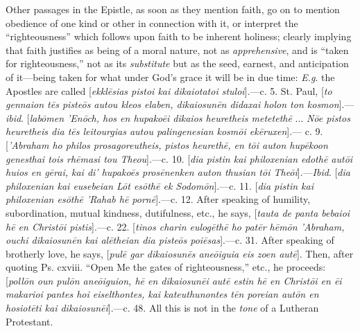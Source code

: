 Other passages in the Epistle, as soon as they mention faith, go on
to mention obedience of one kind or other in connection with it, or
interpret the ``righteousness'' which follows upon faith to be
inherent holiness; clearly implying that faith justifies as being of a
moral nature, not as \emph{apprehensive}, and is ``taken for
righteousness,'' not as its \emph{substitute} but as the seed,
earnest, and anticipation of it—being taken for what under God's
grace it will be in due time: \emph{E.g}. the Apostles are called [\emph{ekkl\={e}sias
pistoi kai dikaiotatoi stuloi}].—c. 5. St. Paul, [\emph{to gennaion
t\={e}s piste\={o}s autou kleos elaben, dikaiosun\={e}n
didaxai holon ton kosmon}].—\emph{ibid}. [\emph{lab\={o}men 'En\={o}ch, hos en
hupako\={e}i dikaios heuretheis meteteth\={e}}
... \emph{N\={o}e pistos heuretheis dia t\={e}s leitourgias autou
palingenesian kosm\={o}i ek\={e}ruxen}].— c. 9. [\emph{'Abraham
ho philos prosagoreutheis, pistos heureth\={e}, en t\={o}i auton
hup\={e}koon genesthai tois rh\={e}masi tou Theou}].—c.
10. [\emph{dia pistin kai philoxenian edoth\={e} aut\={o}i huios en
g\={e}rai, kai di' hupako\={e}s pros\={e}nenken auton thusian t\={o}i
The\={o}i}].—\emph{Ibid}. [\emph{dia philoxenian kai eusebeian L\={o}t
es\={o}th\={e} ek Sodom\={o}n}].—c.
11. [\emph{dia pistin kai philoxenian es\={o}th\={e} 'Rahab h\={e}
porn\={e}}].—c. 12. After speaking of humility,
subordination, mutual kindness, dutifulness, etc., he says, [\emph{tauta
de panta bebaioi h\={e} en Christ\={o}i pistis}].—c. 22. [\emph{tinos
charin eulog\={e}th\={e} ho pat\={e}r h\={e}m\={o}n 'Abraham, ouchi dikaiosun\={e}n kai al\={e}theian dia piste\={o}s
poi\={e}sas}].—c. 31. After
speaking of brotherly love, he says, [\emph{pul\={e} gar dikaiosun\={e}s
ane\={o}iguia eis zoen aut\={e}}]. Then,
after quoting Ps. cxviii. ``Open Me the gates of
righteousness,'' etc., he proceeds: [\emph{poll\={o}n oun pul\={o}n
ane\={o}iguion, h\={e} en dikaiosun\={e}i aut\={e} estin h\={e}
en Christ\={o}i en \={e}i makarioi pantes hoi eiselthontes, kai
kateuthunontes t\={e}n poreian aut\={o}n en hosiot\={e}ti kai
dikaiosun\={e}i}].—c.
48. All this is not in the \emph{tone} of a Lutheran Protestant.

